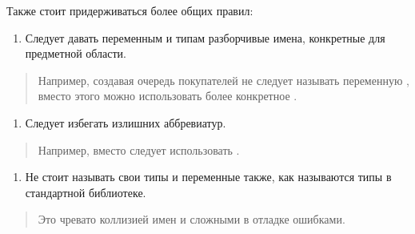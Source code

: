 Также стоит придерживаться более общих правил:

\begin{enumerate}
\item
  Следует давать переменным и типам разборчивые имена, конкретные для
  предметной области.
\end{enumerate}

\begin{quote}
Например, создавая очередь покупателей не следует называть переменную
, вместо этого можно использовать более конкретное
.
\end{quote}

\begin{enumerate}
\item
  Следует избегать излишних аббревиатур.
\end{enumerate}

\begin{quote}
Например, вместо  следует использовать
.
\end{quote}

\begin{enumerate}
\item
  Не стоит называть свои типы и переменные также, как называются типы в
  стандартной библиотеке.
\end{enumerate}

\begin{quote}
Это чревато коллизией имен и сложными в отладке ошибками.
\end{quote}
